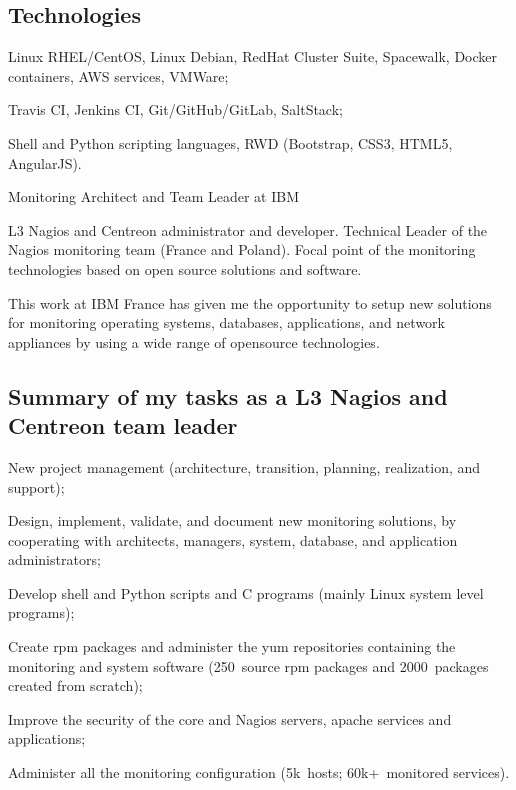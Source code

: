 \subsection{Technologies}

\item{\bdot} Linux RHEL/CentOS, Linux Debian, RedHat Cluster Suite, Spacewalk, Docker
   containers, AWS services, VMWare;
\item{\bdot} Travis CI, Jenkins CI, Git/GitHub/GitLab, SaltStack;
\item{\bdot} Shell and Python scripting languages, RWD (Bootstrap, CSS3, HTML5, AngularJS).


   {Monitoring Architect and Team Leader at IBM}

L3 Nagios and Centreon administrator and developer.
Technical Leader of the Nagios monitoring team (France and Poland).
Focal point of the monitoring technologies based on open source solutions and
software.

This work at IBM France has given me the opportunity to setup new solutions 
for monitoring operating systems, databases, applications, and network 
appliances by using a wide range of opensource technologies.

\subsection{Summary of my tasks as a L3 Nagios and Centreon team leader}

\item{\bdot} New project management (architecture, transition, planning, 
   realization, and support);
\item{\bdot} Design, implement, validate, and document new monitoring solutions,
   by cooperating with architects, managers, system, database, and application 
   administrators;
\item{\bdot} Develop shell and Python scripts and C programs 
   (mainly Linux system level programs);
\item{\bdot} Create rpm packages and administer the yum repositories containing
   the monitoring and system software (250\smallplus~source rpm packages and
   2000~packages created from scratch);
\item{\bdot} Improve the security of the core and Nagios servers, apache 
   services and applications;
\item{\bdot} Administer all the monitoring configuration
   (5k\smallplus~hosts; 60k+~monitored services).

